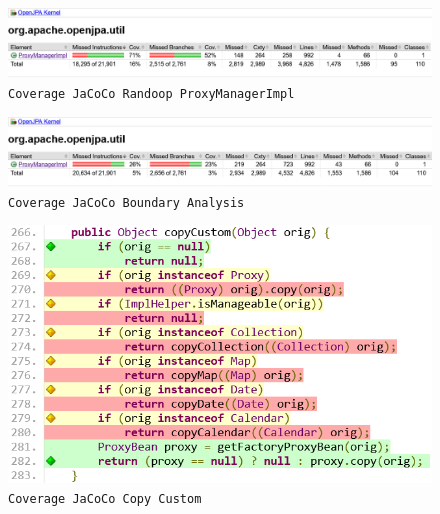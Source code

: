 \documentclass[10pt]{article}
\begin{document}
{		\begin{figure}
			\centering
			\includegraphics[width=1.0\linewidth, frame]{img/jacoco-report-randoop-ProxyManager.png}
			\caption{\texttt{Coverage JaCoCo Randoop ProxyManagerImpl}}
			\label{fig:JacocoRandoopProxyManagerImpl}
		\end{figure}
		
		\begin{figure}
			\centering
			\includegraphics[width=1.0\linewidth, frame]{img/jacoco-report-ba-pm.png}
			\caption{\texttt{Coverage JaCoCo Boundary Analysis}}
			\label{fig:ReportBAPM}
		\end{figure}
		
		\begin{figure}
			\centering
			\includegraphics[width=0.5\linewidth, frame]{img/copy-custom.png}
			\caption{\texttt{Coverage JaCoCo Copy Custom}}
			\label{fig:CopyCustom}
		\end{figure}

		
}
\end{document}
